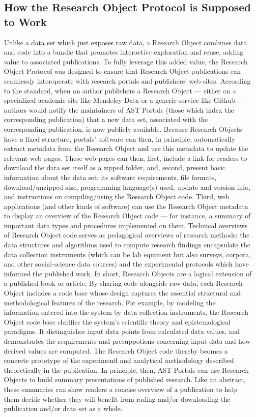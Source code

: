 \documentclass[10pt,letterpaper]{article}
\begin{document}
\subsection{How the Research Object Protocol is Supposed to Work}
Unlike a data set which just exposes raw data, a 
Research Object combines data and code into a bundle 
that promotes interactive exploration and reuse, 
adding value to associated publications.  
To fully leverage this added value, the Research Object 
Protocol was designed to ensure that Research Object 
publications can seamlessly interoperate 
with research portals and publishers' web sites.
\p{}
According to the standard, when an author publishers a 
Research Object --- either on a specialized academic 
site like Mendeley Data or a generic service like 
Github --- authors would notify the maintainers of 
AST Portals (those which index the corresponding publication) 
that a new data set, associated with the corresponding 
publication, is now publicly available.  Because 
Research Objects have a fixed structure, portals' 
software can then, in principle, automatically 
extract metadata from the Research Object and 
use this metadata to update the relevant web pages. 
\p{} 
These web pages can 
then, first, include a link for readers to 
download the data set itself as a zipped folder, 
and, second, present basic information about 
the data set: its software requirements, 
file formats, download/unzipped size, programming 
language(s) used, update and version info, and 
instructions on compiling/using the 
Research Object code.  Third, 
web applications (and other kinds of software) can use 
the Research Object metadata to display an overview of 
the Research Object code --- for instance, a summary of 
important data types and procedures implemented on them.  
Technical overviews of Research Object code 
serves as pedagogical overviews of research 
methods: the data structures and algorithms used to compute 
research findings encapsulate the data collection 
instruments (which can be lab equiment but also surveys, 
corpora, and other social-science data sources) 
and the experimental protocols which have informed 
the published work.
\p{} 
In short, Research Objects are a logical extension of a 
published book or article.  By sharing code alongside raw 
data, each Research Object includes a code base whose 
design captures the essential structural and methodological 
features of the research.  For example, by 
modeling the information entered into the system by 
data collection instruments, the Research Object 
code base clarifies the system's scientific theory and 
epistemological paradigms.  It distinguishes 
input data points from calculated data values, and 
demonstrates the requirements and presuppotions 
concerning input data and how derived values 
are computed.  The 
Research Object code thereby bcomes a concrete 
prototype of the experimentl and analytical 
methodology described theoretically in the publication.
\p{}
In principle, then, AST  
Portals can use Research Objects to build summary 
presentations of published research.  Like an 
abstract, these summaries can show readers a 
concise overview of a publication to help them 
decide whether they will benefit from rading and/or 
downloading the publication and/or data set as a whole.
\p{}
\end{document}
